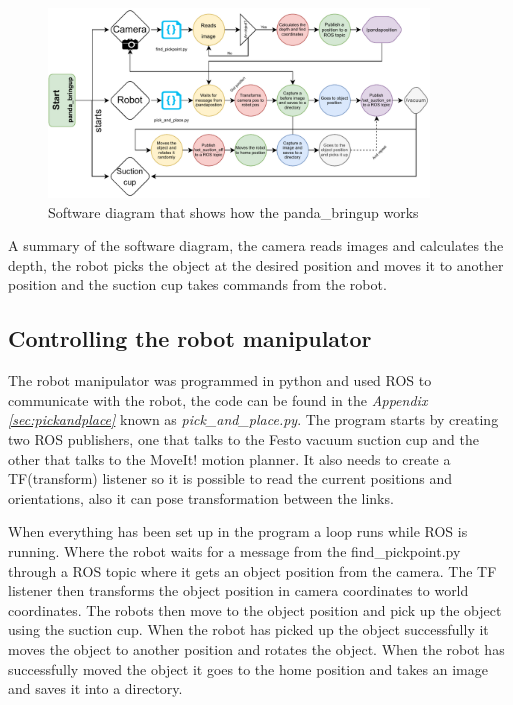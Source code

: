 \begin{figure}[h]
    \centering
    \includegraphics[width=0.9\textwidth]{graphics/softwareDiagram.pdf}
    \caption{Software diagram that shows how the panda\_bringup works}
    \label{fig:softwarediagram}
\end{figure}

A summary of the software diagram, the camera reads images and calculates the depth, the robot picks the object at the desired position and moves it to another position and the suction cup takes commands from the robot.

\subsection{Controlling the robot manipulator}\label{robotcontrol}
The robot manipulator was programmed in python and used ROS to communicate with the robot, the code can be found in the \textit{Appendix \ref{sec:pickandplace}} known as \textit{pick\_and\_place.py}. 
The program starts by creating two ROS publishers, one that talks to the Festo vacuum suction cup and the other that talks to the MoveIt! motion planner. 
It also needs to create a TF(transform) listener so it is possible to read the current positions and orientations, also it can pose transformation between the links. 

When everything has been set up in the program a loop runs while ROS is running. 
Where the robot waits for a message from the find\_pickpoint.py through a ROS topic where it gets an object position from the camera.
The TF listener then transforms the object position in camera coordinates to world coordinates. The robots then move to the object position and pick up the object using the suction cup. When the robot has picked up the object successfully it moves the object to another position and rotates the object. When the robot has successfully moved the object it goes to the home position and takes an image and saves it into a directory. 

